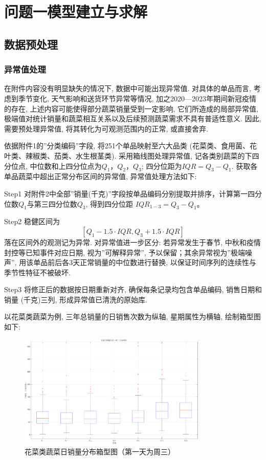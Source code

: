 \documentclass{cumcmthesis}
\begin{document}
\section{问题一模型建立与求解}%

\subsection{数据预处理}

\subsubsection{异常值处理}
在附件内容没有明显缺失的情况下, 数据中可能出现异常值. 对具体的单品而言, 考虑到季节变化, 天气影响和送货环节异常等情况, 加之2020—2023年期间新冠疫情的存在, 上述内容可能使得部分蔬菜销量受到一定影响, 它们所造成的局部异常值, 极端值对统计销量和蔬菜相互关系以及后续预测蔬菜需求不具有普适性意义. 因此, 需要预处理异常值, 将其转化为可观测范围内的正常, 或直接舍弃. 

依据附件1的''分类编码''字段, 将251个单品映射至六大品类 (花菜类、食用菌、花叶类、辣椒类、茄类、水生根茎类). 采用箱线图处理异常值, 记各类别蔬菜的下四分位点, 中位数和上四分位点为$Q_1$，$Q_2$，$Q_3$; 四分位距为$IQR=Q_3-Q_1$. 获取各单品蔬菜中超出正常分布区间的异常值, 异常值处理方法如下:

Step1 对附件2中全部''销量(千克)''字段按单品编码分别提取并排序，计算第一四分位数$Q_1$与第三四分位数$Q_3$, 得到四分位距 $IQR_{1-3}=Q_3-Q_1$。

Step2 稳健区间为
\[ [Q_1 - 1.5 \cdot IQR, Q_3 + 1.5 \cdot IQR] \]
落在区间外的观测记为异常. 对异常值进一步区分: 
若异常发生于春节, 中秋和疫情封控等已知事件对应日期, 视为''可解释异常'', 予以保留；其余异常视为''极端噪声'', 用该单品前后各3天正常销量的中位数进行替换, 以保证时间序列的连续性与季节性特征不被破坏.  

Step3 将修正后的数据按日期重新对齐, 确保每条记录均包含单品编码, 销售日期和销量 (千克)三列, 形成异常值已清洗的原始库. 

以花菜类蔬菜为例, 三年总销量的日销售次数为纵轴, 星期属性为横轴, 绘制箱型图如下: 
\begin{figure}[H]
    \centering
    \includegraphics[width=0.8\textwidth]{花菜日销量分布(第一天为周3).png} 
    \caption{花菜类蔬菜日销量分布箱型图（第一天为周三）}
\end{figure}
\end{document}
